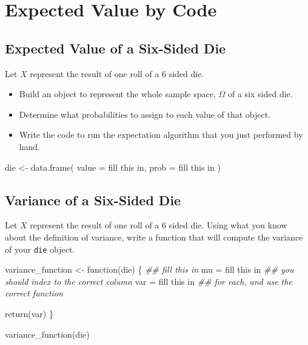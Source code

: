 \documentclass[
  letterpaper,
  DIV=11,
  numbers=noendperiod]{scrreprt}
\newenvironment{Shaded}{\begin{snugshade}}{\end{snugshade}}
\newcommand{\AttributeTok}[1]{\textcolor[rgb]{0.40,0.45,0.13}{#1}}
\newcommand{\ControlFlowTok}[1]{\textcolor[rgb]{0.00,0.23,0.31}{#1}}
\newcommand{\DocumentationTok}[1]{\textcolor[rgb]{0.37,0.37,0.37}{\textit{#1}}}
\newcommand{\FunctionTok}[1]{\textcolor[rgb]{0.28,0.35,0.67}{#1}}
\newcommand{\NormalTok}[1]{\textcolor[rgb]{0.00,0.23,0.31}{#1}}
\newcommand{\OtherTok}[1]{\textcolor[rgb]{0.00,0.23,0.31}{#1}}
\newcommand{\StringTok}[1]{\textcolor[rgb]{0.13,0.47,0.30}{#1}}
\providecommand{\tightlist}{%
  \setlength{\itemsep}{0pt}\setlength{\parskip}{0pt}}\usepackage{longtable,booktabs,array}
\begin{document}
\section{Expected Value by Code}\label{expected-value-by-code}

\subsection{Expected Value of a Six-Sided
Die}\label{expected-value-of-a-six-sided-die}

Let \(X\) represent the result of one roll of a 6 sided die.

\begin{itemize}
\tightlist
\item
  Build an object to represent the whole sample space, \(\Omega\) of a
  six sided die.
\item
  Determine what probabilities to assign to each value of that object.
\item
  Write the code to run the expectation algorithm that you just
  performed by hand.
\end{itemize}

\begin{Shaded}
\begin{Highlighting}[]
\NormalTok{die }\OtherTok{\textless{}{-}} \FunctionTok{data.frame}\NormalTok{(}
  \AttributeTok{value =} \StringTok{\textquotesingle{}fill this in\textquotesingle{}}\NormalTok{,}
  \AttributeTok{prob  =} \StringTok{\textquotesingle{}fill this in\textquotesingle{}}
\NormalTok{)}
\end{Highlighting}
\end{Shaded}

\subsection{Variance of a Six-Sided
Die}\label{variance-of-a-six-sided-die}

Let \(X\) represent the result of one roll of a 6 sided die. Using what
you know about the definition of variance, write a function that will
compute the variance of your \texttt{die} object.

\begin{Shaded}
\begin{Highlighting}[]
\NormalTok{variance\_function }\OtherTok{\textless{}{-}} \ControlFlowTok{function}\NormalTok{(die) \{ }
  \DocumentationTok{\#\# fill this in}
\NormalTok{  mu }\OtherTok{=} \StringTok{\textquotesingle{}fill this in\textquotesingle{}}   \DocumentationTok{\#\# you should index to the correct column}
\NormalTok{  var }\OtherTok{=} \StringTok{\textquotesingle{}fill this in\textquotesingle{}}  \DocumentationTok{\#\# for each, and use the correct function}
  
  \FunctionTok{return}\NormalTok{(var)}
\NormalTok{\}}

\FunctionTok{variance\_function}\NormalTok{(die)}
\end{Highlighting}
\end{Shaded}
\end{document}
